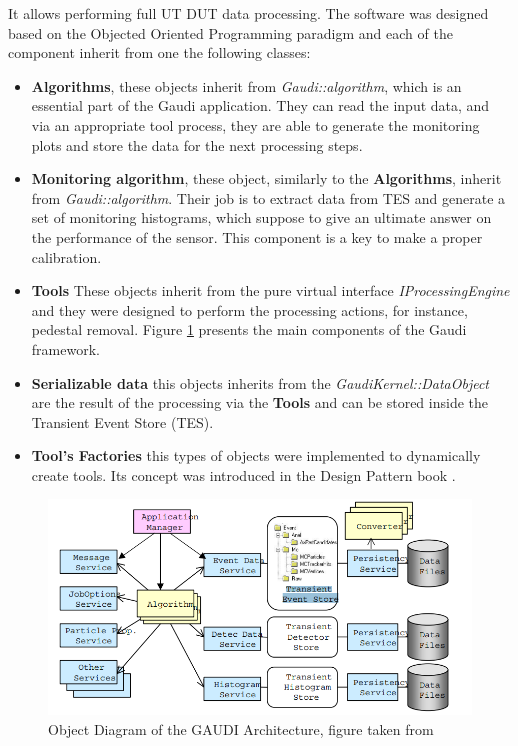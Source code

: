 It allows performing full UT DUT data processing.
The software was designed based on the Objected Oriented Programming paradigm and each of the component inherit from one the following classes:  

\begin{itemize}
    \item \textbf{Algorithms}, these objects inherit from \textit{Gaudi::algorithm}, which is an essential part of the Gaudi application. They can read the input data, and via an appropriate tool process, they are able to generate the monitoring plots and store the data for the next processing steps. 
    \item \textbf{Monitoring algorithm}, these object, similarly to the \textbf{Algorithms}, inherit from  \textit{Gaudi::algorithm}. Their job is to extract data from TES and generate a set of monitoring histograms, which suppose to give an  ultimate answer on the performance of the sensor. This component is a key to make a  proper calibration. 
    \item \textbf{Tools} These objects inherit from the pure virtual interface \textit{IProcessingEngine} and they were designed to perform the processing actions, for instance, pedestal removal. Figure \ref{fig:gaudi flow} presents the main components of the Gaudi framework.   
    \item \textbf{Serializable data} this objects inherits from the \textit{GaudiKernel::DataObject} are the result of the processing via the \textbf{Tools} and can be stored inside the Transient Event Store (TES). 
    \item \textbf{Tool's Factories} this types of objects were implemented to dynamically create tools. Its concept was introduced in the Design Pattern book \cite{DesignPatterns}. 
\end{itemize}

\begin{figure}[h]
\centering
\includegraphics{figures/Gaudi.png}
\caption{Object Diagram of the GAUDI Architecture, figure taken from \cite{Gaudi}}
\label{fig:gaudi flow}
\end{figure}


